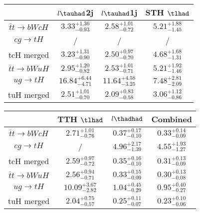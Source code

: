 \centering
\begin{tabular}{|c|c|c|c|} \hline
 & $l\tauhad$2j & $l\tauhad$1j & STH $\tlhad$\\\hline
$\bar{t}t\to bWcH$ & $3.33^{+1.36}_{-0.93}$ & $2.58^{+1.01}_{-0.72}$ & $5.21^{+1.88}_{-1.45}$\\\hline
$cg\to tH$ &  / &  / &  /\\\hline
tcH merged & $3.23^{+1.31}_{-0.90}$ & $2.50^{+0.97}_{-0.70}$ & $4.68^{+1.68}_{-1.31}$\\\hline
$\bar{t}t\to bWuH$ & $2.95^{+1.20}_{-0.82}$ & $2.53^{+1.01}_{-0.71}$ & $5.21^{+1.92}_{-1.46}$\\\hline
$ug\to tH$ & $16.84^{+6.44}_{-4.71}$ & $11.64^{+4.58}_{-3.25}$ & $7.48^{+2.81}_{-2.09}$\\\hline
tuH merged & $2.51^{+1.01}_{-0.70}$ & $2.09^{+0.83}_{-0.58}$ & $3.06^{+1.12}_{-0.86}$\\\hline
\end{tabular}
\begin{tabular}{|c|c|c|c|} \hline
 & TTH $\tlhad$ & $l\thadhad$ & Combined\\\hline
$\bar{t}t\to bWcH$ & $2.71^{+1.01}_{-0.76}$ & $0.37^{+0.17}_{-0.10}$ & $0.33^{+0.14}_{-0.09}$\\\hline
$cg\to tH$ &  / & $4.96^{+2.17}_{-1.39}$ & $4.55^{+1.93}_{-1.27}$\\\hline
tcH merged & $2.59^{+0.97}_{-0.72}$ & $0.35^{+0.16}_{-0.10}$ & $0.31^{+0.13}_{-0.09}$\\\hline
$\bar{t}t\to bWuH$ & $2.56^{+0.94}_{-0.71}$ & $0.33^{+0.15}_{-0.09}$ & $0.30^{+0.13}_{-0.08}$\\\hline
$ug\to tH$ & $10.09^{+3.67}_{-2.82}$ & $1.04^{+0.45}_{-0.29}$ & $0.95^{+0.40}_{-0.27}$\\\hline
tuH merged & $2.04^{+0.75}_{-0.57}$ & $0.25^{+0.11}_{-0.07}$ & $0.23^{+0.10}_{-0.06}$\\\hline
\end{tabular}
